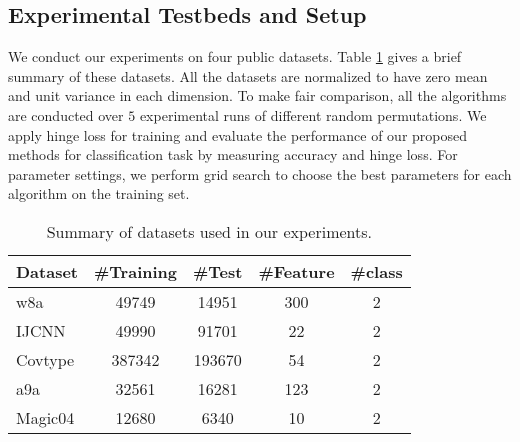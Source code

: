 \documentclass[letterpaper]{article} %
\begin{document}
\subsection{Experimental Testbeds and Setup}
We conduct our experiments on four public datasets. Table \ref{tab0} gives a brief summary of these datasets. All the datasets are normalized to have zero mean and unit variance in each dimension. To make fair comparison, all the algorithms are conducted over $5$ experimental runs of different random permutations. We apply hinge loss for training and evaluate the performance of our proposed methods for classification task by measuring accuracy and hinge loss. For parameter settings, we perform grid search to choose the best parameters for each algorithm on the training set.
\begin{table}[htb]
	\centering
		\begin{tabular} {|l|c|c|c|c|}
			\hline
			Dataset & \#Training & \#Test & \#Feature   & \#class \\
			\hline
			w8a			& 49749		& 14951		& 300	& 2\\
			IJCNN       & 49990     & 91701     & 22	& 2\\
			Covtype		& 387342	& 193670	& 54	& 2\\
			a9a			& 32561		& 16281		& 123	& 2\\
			Magic04		& 12680		& 6340		& 10	& 2\\
			\hline
		\end{tabular}
	\caption{Summary of datasets used in our experiments.}
	\label{tab0}
\end{table}
\end{document}
